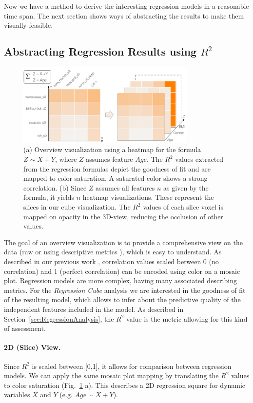 \documentclass[journal]{style/vgtc} 			          %
\begin{document}
Now we have a method to derive the interesting regression models in a reasonable time span.
The next section shows ways of abstracting the results to make them visually feasible.

\subsection{Abstracting Regression Results using $R^2$}
\begin{figure}[htb]
 \centering
 \includegraphics[width=3.5in]{figures/cube}
 \caption{
 (a) Overview visualization using a heatmap for the formula $Z \sim X + Y$, where $Z$ assumes feature $Age$.
 The $R^2$ values extracted from the regression formulas depict the goodness of fit and are mapped to color saturation.
 A saturated color shows a strong correlation.
 (b) Since $Z$ assumes all features $n$ as given by the formula, it yields $n$ heatmap visualizations.
 These represent the slices in our cube visualization.
 The $R^2$ values of each slice voxel is mapped on opacity in the 3D-view, reducing the occlusion of other values.
 }
  \label{fig:Cube}
\end{figure}
The goal of an overview visualization is to provide a comprehensive view on the data (raw or using descriptive metrics \cite{Bertini}), which is easy to understand.
As described in our previous work \cite{Klemm2014VIS}, correlation values scaled between 0 (no correlation) and 1 (perfect correlation) can be encoded using color on a mosaic plot.
Regression models are more complex, having many associated describing metrics.
For the \emph{Regression Cube} analysis we are interested in the goodness of fit of the resulting model, which allows to infer about the predictive quality of the independent features included in the model.
As described in Section~\ref{sec:RegressionAnalysis}, the $R^2$ value is the metric allowing for this kind of assessment.
\paragraph{2D (Slice) View.}
Since $R^2$ is scaled between [0,1], it allows for comparison between regression models.
We can apply the same mosaic plot mapping by translating the $R^2$ values to color saturation (Fig.~\ref{fig:Cube} a).
This describes a 2D regression square for dynamic variables $X$ and $Y$ (e.g. $Age \sim X + Y$).
\end{document}
